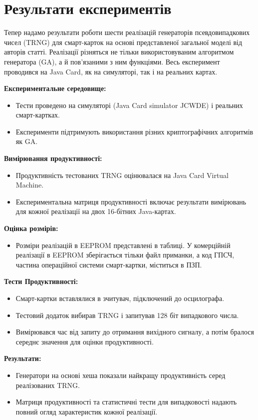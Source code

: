 \section{Результати експериментів}


Тепер надамо результати роботи шести реалізацій генераторів псевдовипадкових чисел (TRNG) для смарт-карток на основі представленої загальної моделі від авторів статті. Реалізації різняться не тільки використовуваним алгоритмом генератора (GA), а й пов'язаними з ним функціями. Весь експеримент проводився на Java Card, як на симуляторі, так і на реальних картах.


\textbf{Експериментальне середовище:}
\begin{itemize}
    \item Тести проведено на симуляторі (Java Card simulator JCWDE) і реальних смарт-картках.
    \item Експерименти підтримують використання різних криптографічних алгоритмів як GA.
\end{itemize}


\textbf{Вимірювання продуктивності:}
\begin{itemize}
    \item Продуктивність тестованих TRNG оцінювалася на Java Card Virtual Machine.
    \item Експериментальна матриця продуктивності включає результати вимірювань для кожної реалізації на двох 16-бітних Java-картах.
\end{itemize}


\textbf{Оцінка розмірів:}
\begin{itemize}
    \item Розміри реалізацій в EEPROM представлені в таблиці. У комерційній реалізації в EEPROM зберігається тільки файл приманки, а код ГПСЧ, частина операційної системи смарт-картки, міститься в ПЗП.
\end{itemize}


\textbf{Тести Продуктивності:}
\begin{itemize}
    \item Смарт-картки вставлялися в зчитувач, підключений до осцилографа.
    \item Тестовий додаток вибирав TRNG і запитував 128 біт випадкового числа.
    \item Вимірювався час від запиту до отримання вихідного сигналу, а потім бралося середнє значення для оцінки продуктивності.
\end{itemize}


\textbf{Результати:}
\begin{itemize}
    \item Генератори на основі хеша показали найкращу продуктивність серед реалізованих TRNG.
    \item Матриця продуктивності та статистичні тести для випадковості надають повний огляд характеристик кожної реалізації.
\end{itemize}

